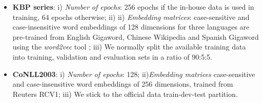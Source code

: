 \documentclass[11pt,a4paper]{article}
\begin{document}
\begin{itemize}
	\item \textbf{KBP series}:
	i) {\it Number of epochs}: 256 epochs if the in-house data is used in training, 64 epochs otherwise; ii)
	ii) {\it Embedding matrices}: 
	case-sensitive and case-insensitive word embeddings of 128 dimensions for three languages are pre-trained from English Gigaword, Chinese Wikipedia and Spanish Gigaword using the {\em word2vec} tool \cite{mikolov2013distributed};
	iii) We normally split the available training data into training, validation and evaluation sets in a ratio of 90:5:5.
	
	\item \textbf{CoNLL2003}:
	i) {\it Number of epochs}: 128;
	ii){\it Embedding matrices} case-sensitive and case-insensitive word embeddings of 256 dimensions, trained from Reuters RCV1;
	iii) We stick to the official data train-dev-test partition.  
\end{itemize}


\end{document}
